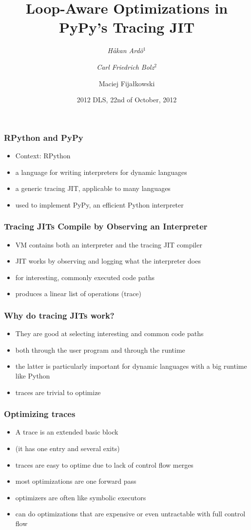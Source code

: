 \documentclass[utf8x]{beamer}
\title{Loop-Aware Optimizations in PyPy’s Tracing JIT}
\author[Ardö, Bolz, Fijałkowski]{\emph{Håkan Ardö}$^1$ \and \emph{Carl Friedrich Bolz}$^2$ \and Maciej Fijałkowski}
\institute[Lund, Düsseldorf]{
$^1$Centre for Mathematical Sciences, Lund University \and
$^2$Heinrich-Heine-Universität Düsseldorf, STUPS Group, Germany
}
\date{2012 DLS, 22nd of October, 2012}
\begin{document}
\begin{frame}
  \titlepage
\end{frame}

\begin{frame}
  \frametitle{RPython and PyPy}
  \begin{itemize}
      \item Context: RPython
      \item a language for writing interpreters for dynamic languages
      \item a generic tracing JIT, applicable to many languages
      \item used to implement PyPy, an efficient Python interpreter
  \end{itemize}
\end{frame}

\begin{frame}
  \frametitle{Tracing JITs Compile by Observing an Interpreter}
  \begin{itemize}
      \item VM contains both an interpreter and the tracing JIT compiler
      \item JIT works by observing and logging what the interpreter does
      \item for interesting, commonly executed code paths
      \item produces a linear list of operations (trace)
  \end{itemize}
\end{frame}

\begin{frame}
  \frametitle{Why do tracing JITs work?}
  \begin{itemize}
      \item They are good at selecting interesting and common code paths
      \item both through the user program and through the runtime
      \item the latter is particularly important for dynamic languages with a big runtime like Python
          \pause
      \item traces are trivial to optimize
  \end{itemize}
\end{frame}

\begin{frame}
  \frametitle{Optimizing traces}
  \begin{itemize}
      \item A trace is an extended basic block
      \item (it has one entry and several exits)
      \item traces are easy to optime due to lack of control flow merges
          \pause
      \item most optimizations are one forward pass
      \item optimizers are often like symbolic executors
      \item can do optimizations that are expensive or even untractable with full control flow
  \end{itemize}
\end{frame}
\end{document}
